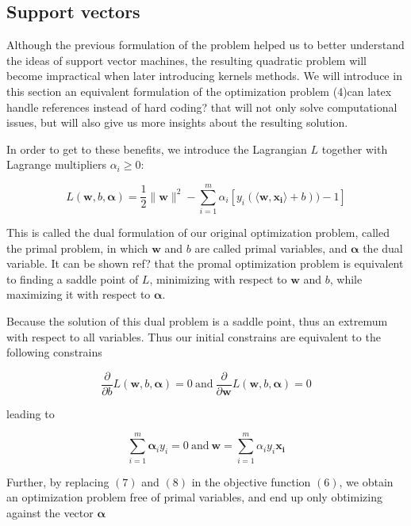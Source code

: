 \subsection {Support vectors}

Although the previous formulation of the problem helped us to better understand the ideas of support vector machines, the resulting quadratic problem will become impractical when later introducing kernels methods. We will introduce in this section an equivalent formulation of the optimization problem (4)\textcolor[rgb]{1,0,0}{can latex handle references instead of hard coding?}
  that will not only solve computational issues, but will also give us more insights about the resulting solution.

In order to get to these benefits, we introduce the Lagrangian $L$ together with Lagrange multipliers $\alpha_i \ge 0$:

\begin{equation}
  L(\mathbf{w}, b, \boldsymbol{\alpha}) = \frac{1}{2}\|\mathbf{w}\|^2 - \sum^m_{i=1} \alpha_i[y_i(\langle \mathbf{w}, \mathbf{x_i}\rangle + b)) - 1]
\end{equation}

This is called the dual formulation of our original optimization problem, called the primal problem, in which $\mathbf{w}$ and $b$ are called primal variables, and $\boldsymbol{\alpha}$ the dual variable. It can be shown \textcolor[rgb]{1,0,0}{ref?} that the promal optimization problem is equivalent to finding a saddle point of $L$, minimizing with respect to $\mathbf{w}$ and $b$, while maximizing it with respect to $
\boldsymbol{\alpha}$.

Because the solution of this dual problem is a saddle point, thus an extremum with respect to all variables. Thus our initial constrains are equivalent to the following constrains

\begin{equation}
  \frac{\partial}{\partial b}L(\mathbf{w}, b, \boldsymbol{\alpha}) = 0
  \ \text{and}\ 
  \frac{\partial}{\partial \mathbf{w}}L(\mathbf{w}, b, \boldsymbol{\alpha}) = 0
\end{equation}

leading to

\begin{equation}
  \sum^m_{i=1} \boldsymbol{\alpha}_iy_i = 0
  \ \text{and}\ 
  \mathbf{w} = \sum^m_{i=1} \alpha_iy_i\mathbf{x_i}
\end{equation}

Further, by replacing $(7)$ and $(8)$ in the objective function $(6)$, we obtain an optimization problem free of primal variables, and end up only obtimizing against the vector $\boldsymbol{\alpha}$

